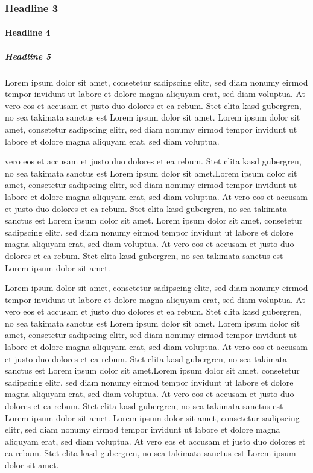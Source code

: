 \documentclass[
  twocolumn]{article}
\begin{document}
\hypertarget{headline-3}{%
\subsubsection{Headline 3}\label{headline-3}}

\hypertarget{headline-4}{%
\paragraph{Headline 4}\label{headline-4}}

\hypertarget{headline-5}{%
\subparagraph{Headline 5}\label{headline-5}}

Lorem ipsum dolor sit amet, consetetur sadipscing elitr, sed diam nonumy
eirmod tempor invidunt ut labore et dolore magna aliquyam erat, sed diam
voluptua. At vero eos et accusam et justo duo dolores et ea rebum. Stet
clita kasd gubergren, no sea takimata sanctus est Lorem ipsum dolor sit
amet. Lorem ipsum dolor sit amet, consetetur sadipscing elitr, sed diam
nonumy eirmod tempor invidunt ut labore et dolore magna aliquyam erat,
sed diam voluptua.

vero eos et accusam et justo duo dolores et ea rebum. Stet clita kasd
gubergren, no sea takimata sanctus est Lorem ipsum dolor sit amet.Lorem
ipsum dolor sit amet, consetetur sadipscing elitr, sed diam nonumy
eirmod tempor invidunt ut labore et dolore magna aliquyam erat, sed diam
voluptua. At vero eos et accusam et justo duo dolores et ea rebum. Stet
clita kasd gubergren, no sea takimata sanctus est Lorem ipsum dolor sit
amet. Lorem ipsum dolor sit amet, consetetur sadipscing elitr, sed diam
nonumy eirmod tempor invidunt ut labore et dolore magna aliquyam erat,
sed diam voluptua. At vero eos et accusam et justo duo dolores et ea
rebum. Stet clita kasd gubergren, no sea takimata sanctus est Lorem
ipsum dolor sit amet.

Lorem ipsum dolor sit amet, consetetur sadipscing elitr, sed diam nonumy
eirmod tempor invidunt ut labore et dolore magna aliquyam erat, sed diam
voluptua. At vero eos et accusam et justo duo dolores et ea rebum. Stet
clita kasd gubergren, no sea takimata sanctus est Lorem ipsum dolor sit
amet. Lorem ipsum dolor sit amet, consetetur sadipscing elitr, sed diam
nonumy eirmod tempor invidunt ut labore et dolore magna aliquyam erat,
sed diam voluptua. At vero eos et accusam et justo duo dolores et ea
rebum. Stet clita kasd gubergren, no sea takimata sanctus est Lorem
ipsum dolor sit amet.Lorem ipsum dolor sit amet, consetetur sadipscing
elitr, sed diam nonumy eirmod tempor invidunt ut labore et dolore magna
aliquyam erat, sed diam voluptua. At vero eos et accusam et justo duo
dolores et ea rebum. Stet clita kasd gubergren, no sea takimata sanctus
est Lorem ipsum dolor sit amet. Lorem ipsum dolor sit amet, consetetur
sadipscing elitr, sed diam nonumy eirmod tempor invidunt ut labore et
dolore magna aliquyam erat, sed diam voluptua. At vero eos et accusam et
justo duo dolores et ea rebum. Stet clita kasd gubergren, no sea
takimata sanctus est Lorem ipsum dolor sit amet.
\end{document}
